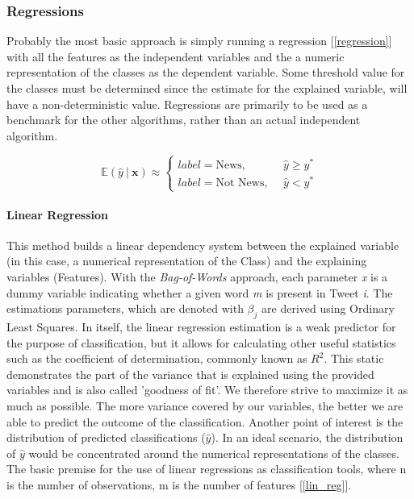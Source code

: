 	\subsubsection{Regressions}
	Probably the most basic approach is simply running a regression [\ref{regression}] with all the features as the independent variables and the a numeric representation of the classes as the dependent variable. Some threshold value for the classes must be determined since the estimate for the explained variable, will have a non-deterministic value. Regressions are primarily to be used as a benchmark for the other algorithms, rather than an actual independent algorithm.
	
	\begin{equation}
		\mathbb{E}(\hat{y} \ \vert \ \textbf{x}) \approx 
		\begin{cases}
			label = \text{News}, &\hat{y} \geq y^* \\
			label = \text{Not News},\ \ &\hat{y} < y^*
		\end{cases}
		\label{regression}
	\end{equation}
	
	\par
	\paragraph{Linear Regression} 
		This method builds a linear dependency system between the explained variable (in this case, a numerical representation of the Class) and the explaining variables (Features). With the \textit{Bag-of-Words} approach, each parameter \textit{x} is a dummy variable indicating whether a given word \textit{m} is present in Tweet \textit{i}. The estimations parameters, which are denoted with $\beta_j$ are derived using Ordinary Least Squares. In itself, the linear regression estimation is a weak predictor for the purpose of classification, but it allows for calculating other useful statistics such as the coefficient of determination, commonly known as $R^2$. This static demonstrates the part of the variance that is explained using the provided variables and is also called 'goodness of fit'. We therefore strive to maximize it as much as possible. The more variance covered by our variables, the better we are able to predict the outcome of the classification. Another point of interest is the distribution of predicted classifications ($\hat{y}$). In an ideal scenario, the distribution of $\hat{y}$ would be concentrated around the numerical representations of the classes.	The basic premise for the use of linear regressions as classification tools, where n is the number of observations, m is the number of features [\ref{lin_reg}].
	
